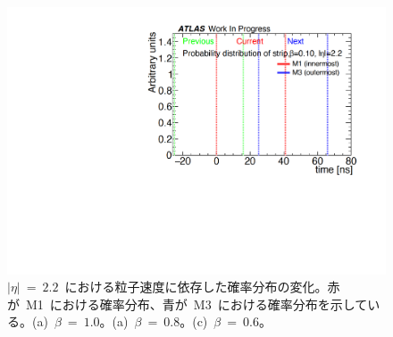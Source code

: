 \begin{figure}[H]
\begin{minipage}{0.33\hsize}
    \subcaption{}
    \end{minipage}
    \begin{minipage}{0.33\hsize}
    \centering   
    \includegraphics[width=\textwidth,page=7]{img/rec/rec_e2.2_s.pdf}
    \subcaption{}
    \end{minipage}
    \caption[$|\eta|~=~2.2$~における粒子速度に依存した確率分布の変化]{$|\eta|~=~2.2$~における粒子速度に依存した確率分布の変化。赤が~M1~における確率分布、青が~M3~における確率分布を示している。(a)~$\beta~=~1.0$。(a)~$\beta~=~0.8$。(c)~$\beta~=~0.6$。}\label{fig:recbeta1}
\end{figure}

